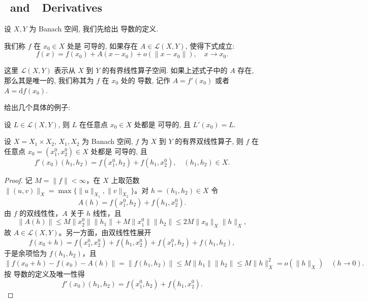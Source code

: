 \documentclass[11pt]{ctexart}
\begin{document}
\subsection{\Frechet\ and\ \Gateaux\  Derivatives}
设 $X,Y $ 为 Banach 空间, 我们先给出 \Frechet 导数的定义.
\begin{definition}[\Frechet 导数]
  我们称 $f$ 在 $x_{0}\in X$ 处是 \Frechet 可导的, 如果存在 $A \in \mathscr{L}(X,Y)$, 使得下式成立:
  \begin{equation}
    f(x) = f(x_{0}) + A(x-x_{0}) + o(\|x-x_{0}\|), \quad x \to x_{0}.
  \end{equation}
\end{definition}
\begin{remark}
  这里 $\mathscr{L}(X,Y)$ 表示从 $X$ 到 $Y$ 的有界线性算子空间. 如果上述式子中的 $A$ 存在, 那么其是唯一的, 我们称其为 $f$ 在 $x_{0}$ 处的 \Frechet 导数,
  记作 $A=f'(x_{0})$ 或者 $A = \mathrm{d}f(x_{0})$.
\end{remark}
给出几个具体的例子:
\begin{example}
  设 $L \in \mathscr{L}(X,Y)$, 则 $L$ 在任意点 $x_{0} \in X$ 处都是 \Frechet 可导的, 且 $L'(x_{0}) = L$.
\end{example}
\begin{example}
  设 $X = X_{1} \times X_{2}$, $X_{1}, X_{2}$ 为 Banach 空间, $f$ 为 $X$ 到 $Y$ 的有界双线性算子, 则 $f$ 在任意点 $x_{0} = (x_{1}^{0}, x_{2}^{0}) \in X$ 处都是 \Frechet 可导的, 且
  \begin{equation*}
    f'(x_{0})(h_{1}, h_{2}) = f(x_{1}^{0}, h_{2}) + f(h_{1}, x_{2}^{0}), \quad (h_{1}, h_{2}) \in X.
  \end{equation*}
\end{example}
\begin{proof}
  记 $M = \|f\| < \infty$，在 $X$ 上取范数
  $\|(u,v)\|_{X} = \max\{\|u\|_{X_{1}}, \|v\|_{X_{2}}\}$。对 $h = (h_{1}, h_{2}) \in X$ 令
  \begin{equation*}
    A(h) = f(x_{1}^{0}, h_{2}) + f(h_{1}, x_{2}^{0}).
  \end{equation*}
  由 $f$ 的双线性性，$A$ 关于 $h$ 线性，且
  \begin{equation*}
    \|A(h)\| \le M\|x_{2}^{0}\|\|h_{1}\| + M\|x_{1}^{0}\|\|h_{2}\|
    \le 2M\|x_{0}\|_{X}\|h\|_{X},
  \end{equation*}
  故 $A \in \mathscr{L}(X, Y)$。另一方面，由双线性性展开
  \begin{equation*}
    f(x_{0} + h)
    = f(x_{1}^{0}, x_{2}^{0}) + f(h_{1}, x_{2}^{0}) + f(x_{1}^{0}, h_{2}) + f(h_{1}, h_{2}),
  \end{equation*}
  于是余项恰为 $f(h_{1}, h_{2})$，且
  \begin{equation*}
    \|f(x_{0} + h) - f(x_{0}) - A(h)\| = \|f(h_{1}, h_{2})\|
    \le M\|h_{1}\|\|h_{2}\| \le M\|h\|_{X}^{2} = o(\|h\|_{X}) \quad (h \to 0).
  \end{equation*}
  按 \Frechet 导数的定义及唯一性得
  \begin{equation*}
    f'(x_{0})(h_{1}, h_{2}) = f(x_{1}^{0}, h_{2}) + f(h_{1}, x_{2}^{0}).
  \end{equation*}
\end{proof}
\end{document}
